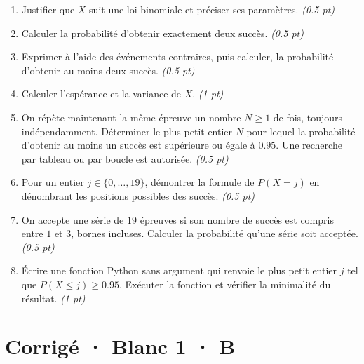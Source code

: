 \begin{enumerate}

\item Justifier que $X$ suit une loi binomiale et préciser ses paramètres. \hfill\textit{(\num{0,5} pt)}

\item Calculer la probabilité d'obtenir exactement deux succès. \hfill\textit{(\num{0,5} pt)}

\item Exprimer à l'aide des événements contraires, puis calculer, la probabilité d'obtenir au moins deux succès. \hfill\textit{(\num{0,5} pt)}

\item Calculer l'espérance et la variance de $X$. \hfill\textit{(1 pt)}

\item On répète maintenant la même épreuve un nombre $N\ge1$ de fois, toujours indépendamment. Déterminer le plus petit entier $N$ pour lequel la probabilité d'obtenir au moins un succès est supérieure ou égale à $\num{0,95}$. Une recherche par tableau ou par boucle est autorisée. \hfill\textit{(\num{0,5} pt)}

\item Pour un entier $j\in\{0,\ldots,19\}$, démontrer la formule de $P(X=j)$ en dénombrant les positions possibles des succès. \hfill\textit{(\num{0,5} pt)}

\item On accepte une série de $19$ épreuves si son nombre de succès est compris entre $1$ et $3$, bornes incluses. Calculer la probabilité qu'une série soit acceptée. \hfill\textit{(\num{0,5} pt)}

\item Écrire une fonction Python sans argument qui renvoie le plus petit entier $j$ tel que $P(X\le j)\ge\num{0,95}$. Exécuter la fonction et vérifier la minimalité du résultat. \hfill\textit{(1 pt)}

\end{enumerate}

\ifmxteacher\mxnewpage

\section*{Corrigé · Blanc 1 · B}\label{cor:5-4}

